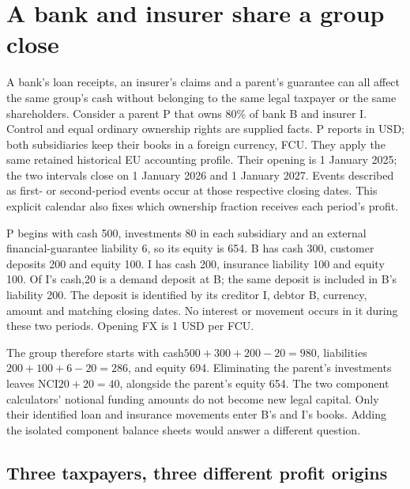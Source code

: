 \section{A bank and insurer share a group close}
\label{sec:sector-company-composition}

A bank's loan receipts, an insurer's claims and a parent's guarantee can all
affect the same group's cash without belonging to the same legal taxpayer or
the same shareholders. Consider a parent P that owns 80\% of bank B and
insurer I. Control and equal ordinary ownership rights are supplied facts.
P reports in USD; both subsidiaries keep their books in a foreign currency,
FCU. They apply the same retained historical EU accounting profile. Their
opening is 1 January 2025; the two intervals close on 1 January 2026 and
1 January 2027. Events described as first- or second-period events occur at
those respective closing dates. This explicit calendar also fixes which
ownership fraction receives each period's profit.

P begins with cash 500, investments 80 in each subsidiary and an external
financial-guarantee liability 6, so its equity is 654. B has cash 300,
customer deposits 200 and equity 100. I has cash 200, insurance liability 100
and equity 100. Of I's cash,20 is a demand deposit at B; the same deposit is
included in B's liability 200. The deposit is identified by its creditor I,
debtor B, currency, amount and matching closing dates. No interest or movement
occurs in it during these two periods. Opening FX is 1 USD per FCU.

The group therefore starts with cash\(500+300+200-20=980\), liabilities
\(200+100+6-20=286\), and equity 694. Eliminating the parent's investments
leaves NCI\(20+20=40\), alongside the parent's equity 654. The two component
calculators' notional funding amounts do not become new legal capital. Only
their identified loan and insurance movements enter B's and I's books.
Adding the isolated component balance sheets would answer a different question.

\subsection{Three taxpayers, three different profit origins}

